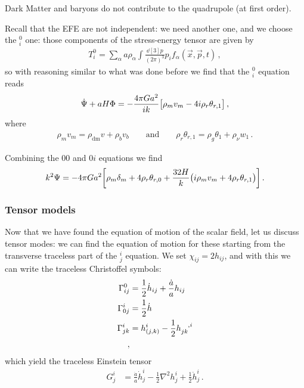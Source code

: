 \documentclass[main.tex]{subfiles}
\begin{document}
Dark Matter and baryons do not contribute to the quadrupole (at first order). 

Recall that the EFE are not independent: we need another one, and we choose the \(^0_i\) one: those components of the stress-energy tensor are given by 
%
\begin{align}
T^{0}_{i} = \sum _{\alpha } a \rho_{\alpha } 
\int \frac{ \dd[3]{p}}{(2\pi )^3} p_{i} f_\alpha  (\vec{x}, \vec{p}, t)
\,,
\end{align}
%
so with reasoning similar to what was done before we find that the \(^0_{i}\) equation reads
%
\begin{align}
\dot{\Psi} + a H \Phi = - \frac{4 \pi G a^2}{ik}
\qty[\rho_{m} v_{m} - 4 i \rho_{r} \theta_{r, 1}]
\,,
\end{align}
%
where 
%
\begin{align}
\rho_{m} v_{m} = \rho _{\text{dm}} v + \rho_{b} v_{b}
\qquad \text{and} \qquad
\rho_{r} \theta_{r, 1} = \rho_{g} \theta_1 + \rho_{\nu } w_{1}
\,.
\end{align}

Combining the \(00\) and \(0i\) equations we find 
%
\begin{align}
k^2 \Psi = -4\pi G a^2
\qty[\rho_{m} \delta_{m} + 4 \rho_{r} \theta_{r, 0}
+ \frac{32H}{k} \qty(i \rho_{m} v_m + 4 \rho_{r} \theta_{r, 1})]
\,.
\end{align}

\subsubsection{Tensor models}

Now that we have found the equation of motion of the scalar field, let us discuss tensor modes: we can find the equation of motion for these starting from the transverse traceless part of the \(^i_{j}\) equation. We set \(\chi_{ij} = 2 h_{ij}\), and with this we can write the traceless Christoffel symbols:
%
\begin{subequations}
\begin{align}
\Gamma^{0}_{ij} &= \frac{1}{2} \dot{h}_{ij} + \frac{\dot{a}}{a} h_{ij}  \\
\Gamma^{i}_{0j} &= \frac{1}{2} \dot{h}  \\
\Gamma^{i}_{jk} &= h^{i}_{(j,k)} - \frac{1}{2} \tensor{h}{_{jk}^{,i}}  \\
\,,
\end{align}
\end{subequations}
%
which yield the traceless Einstein tensor 
%
\begin{align}
G^{i}_{j} &= \frac{\dot{a}}{a} \dot{h}^{i}_{j} 
- \frac{1}{2} \nabla^2 h^{i}_{j} + \frac{1}{2} \ddot{h}^{i}_{j}
\,.
\end{align}
\end{document}
